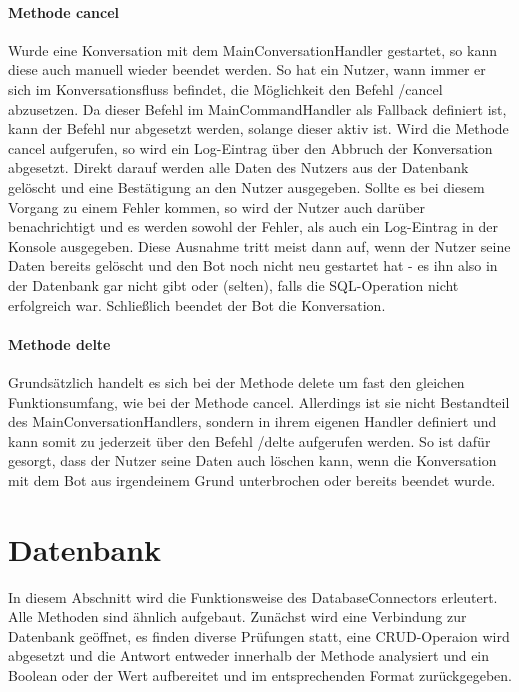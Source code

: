             \paragraph{Methode cancel}
                Wurde eine Konversation mit dem Main\-ConversationHandler gestartet, so kann diese auch manuell wieder beendet werden. So hat ein Nutzer, wann immer er sich im Konversationsfluss befindet, die Möglichkeit den Befehl /cancel abzusetzen. Da dieser Befehl im Main\-CommandHandler als Fallback definiert ist, kann der Befehl nur abgesetzt werden, solange dieser aktiv ist. Wird die Methode cancel aufgerufen, so wird ein Log-Eintrag über den Abbruch der Konversation abgesetzt. Direkt darauf werden alle Daten des Nutzers aus der Datenbank gelöscht und eine Bestätigung an den Nutzer ausgegeben. Sollte es bei diesem Vorgang zu einem Fehler kommen, so wird der Nutzer auch darüber benachrichtigt und es werden sowohl der Fehler, als auch ein Log-Eintrag in der Konsole ausgegeben. Diese Ausnahme tritt meist dann auf, wenn der Nutzer seine Daten bereits gelöscht und den Bot noch nicht neu gestartet hat - es ihn also in der Datenbank gar nicht gibt oder (selten), falls die SQL-Operation nicht erfolgreich war.
                Schließlich beendet der Bot die Konversation.

            \paragraph{Methode delte}
                Grundsätzlich handelt es sich bei der Methode delete um fast den gleichen Funktionsumfang, wie bei der Methode cancel. Allerdings ist sie nicht Bestandteil des Main\-ConversationHandlers, sondern in ihrem eigenen Handler definiert und kann somit zu jederzeit über den Befehl /delte aufgerufen werden. So ist dafür gesorgt, dass der Nutzer seine Daten auch löschen kann, wenn die Konversation mit dem Bot aus irgendeinem Grund unterbrochen oder bereits beendet wurde.


    \section{Datenbank}

        In diesem Abschnitt wird die Funktionsweise des Database\-Connectors erleutert. Alle Methoden sind ähnlich aufgebaut. Zunächst wird eine Verbindung zur Datenbank geöffnet, es finden diverse Prüfungen statt, eine CRUD-Operaion wird abgesetzt und die Antwort entweder innerhalb der Methode analysiert und ein Boolean oder der Wert aufbereitet und im entsprechenden Format zurückgegeben.
                
